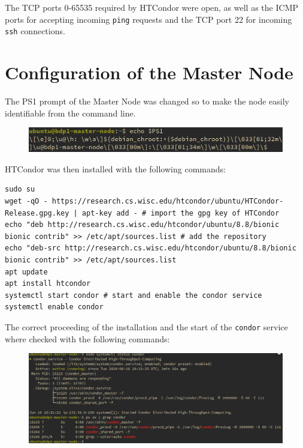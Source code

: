 \documentclass{article}
\begin{document}
The TCP ports 0-65535 required by HTCondor were open, as well as the ICMP ports for accepting incoming \texttt{ping} requests and the TCP port 22 for incoming \texttt{ssh} connections.

\section{Configuration of the Master Node}
The PS1 prompt of the Master Node was changed so to make the node easily identifiable from the command line.

\begin{figure}[!h]
	\center
	\includegraphics[width=\textwidth]{./images/master-ps1.png}
\end{figure}

HTCondor was then installed with the following commands:

\begin{lstlisting}
sudo su
wget -qO - https://research.cs.wisc.edu/htcondor/ubuntu/HTCondor-Release.gpg.key | apt-key add - # import the gpg key of HTCondor
echo "deb http://research.cs.wisc.edu/htcondor/ubuntu/8.8/bionic bionic contrib" >> /etc/apt/sources.list # add the repository
echo "deb-src http://research.cs.wisc.edu/htcondor/ubuntu/8.8/bionic bionic contrib" >> /etc/apt/sources.list
apt update
apt install htcondor
systemctl start condor # start and enable the condor service
systemctl enable condor
\end{lstlisting}

The correct proceeding of the installation and the start of the \texttt{condor} service where checked with the following commands:

\begin{figure}[!h]
	\center
	\includegraphics[width=\textwidth]{./images/condor_installed.png}
\end{figure}
\end{document}
